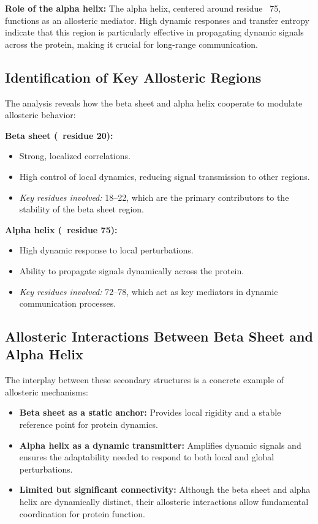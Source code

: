 \documentclass[English, Lau, oneside]{sapthesis}
\begin{document}
\textbf{Role of the alpha helix:} The alpha helix, centered around residue ~75, functions as an allosteric mediator. High dynamic responses and transfer entropy indicate that this region is particularly effective in propagating dynamic signals across the protein, making it crucial for long-range communication.

\subsection{Identification of Key Allosteric Regions}

The analysis reveals how the beta sheet and alpha helix cooperate to modulate allosteric behavior:

\textbf{Beta sheet (~residue 20):}
\begin{itemize}
    \item Strong, localized correlations.
    \item High control of local dynamics, reducing signal transmission to other regions.
    \item \textit{Key residues involved:} 18–22, which are the primary contributors to the stability of the beta sheet region.
\end{itemize}

\textbf{Alpha helix (~residue 75):}
\begin{itemize}
    \item High dynamic response to local perturbations.
    \item Ability to propagate signals dynamically across the protein.
    \item \textit{Key residues involved:} 72–78, which act as key mediators in dynamic communication processes.
\end{itemize}

\subsection{Allosteric Interactions Between Beta Sheet and Alpha Helix}

The interplay between these secondary structures is a concrete example of allosteric mechanisms:

\begin{itemize}
    \item \textbf{Beta sheet as a static anchor:} Provides local rigidity and a stable reference point for protein dynamics.
    \item \textbf{Alpha helix as a dynamic transmitter:} Amplifies dynamic signals and ensures the adaptability needed to respond to both local and global perturbations.
    \item \textbf{Limited but significant connectivity:} Although the beta sheet and alpha helix are dynamically distinct, their allosteric interactions allow fundamental coordination for protein function.
\end{itemize}
\end{document}
